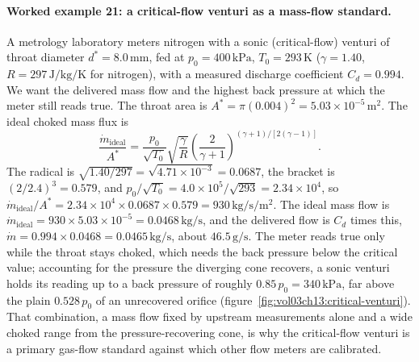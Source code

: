 \paragraph{Worked example 21: a critical-flow venturi as a mass-flow
standard.} A metrology laboratory meters nitrogen with a sonic
(critical-flow) venturi of throat diameter $d^* = 8.0\,\si{\milli
\meter}$, fed at $p_0 = 400\,\text{kPa}$, $T_0 = 293\,\si{\kelvin}$
($\gamma = 1.40$, $R = 297\,\si{\joule\per\kilogram\per\kelvin}$ for
nitrogen), with a measured discharge coefficient $C_d = 0.994$. We want
the delivered mass flow and the highest back pressure at which the meter
still reads true. The throat area is $A^* = \pi(0.004)^2 =
5.03\times 10^{-5}\,\si{\meter}^2$. The ideal choked mass flux is
\[
\frac{\dot m_{\text{ideal}}}{A^*} = \frac{p_0}{\sqrt{T_0}}\sqrt{\frac{
\gamma}{R}}\left(\frac{2}{\gamma + 1}\right)^{(\gamma + 1)/[2(\gamma -
1)]}.
\]
The radical is $\sqrt{1.40/297} = \sqrt{4.71\times 10^{-3}} = 0.0687$,
the bracket is $(2/2.4)^{3} = 0.579$, and
$p_0/\sqrt{T_0} = 4.0\times 10^{5}/\sqrt{293} = 2.34\times 10^{4}$, so
$\dot m_{\text{ideal}}/A^* = 2.34\times 10^{4}\times 0.0687\times 0.579
= 930\,\si{\kilogram\per\second}/\si{\meter}^2$. The ideal mass flow is
$\dot m_{\text{ideal}} = 930\times 5.03\times 10^{-5} =
0.0468\,\si{\kilogram\per\second}$, and the delivered flow is
$C_d$ times this, $\dot m = 0.994\times 0.0468 =
0.0465\,\si{\kilogram\per\second}$, about $46.5\,\text{g/s}$. The meter
reads true only while the throat stays choked, which needs the back
pressure below the critical value; accounting for the pressure the
diverging cone recovers, a sonic venturi holds its reading up to a back
pressure of roughly $0.85\,p_0 = 340\,\text{kPa}$, far above the plain
$0.528\,p_0$ of an unrecovered orifice
(figure~\ref{fig:vol03ch13:critical-venturi}). That combination, a mass
flow fixed by upstream measurements alone and a wide choked range from
the pressure-recovering cone, is why the critical-flow venturi is a
primary gas-flow standard against which other flow meters are
calibrated.



